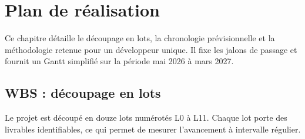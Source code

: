 \chapter{Plan de réalisation}
\label{ch:plan-realisation}

Ce chapitre détaille le découpage en lots, la chronologie prévisionnelle et la méthodologie retenue pour un développeur unique. Il fixe les jalons de passage et fournit un Gantt simplifié sur la période mai 2026 à mars 2027.

\section{WBS : découpage en lots}
\label{sec:wbs}

Le projet est découpé en douze lots numérotés L0 à L11. Chaque lot porte des livrables identifiables, ce qui permet de mesurer l'avancement à intervalle régulier.

